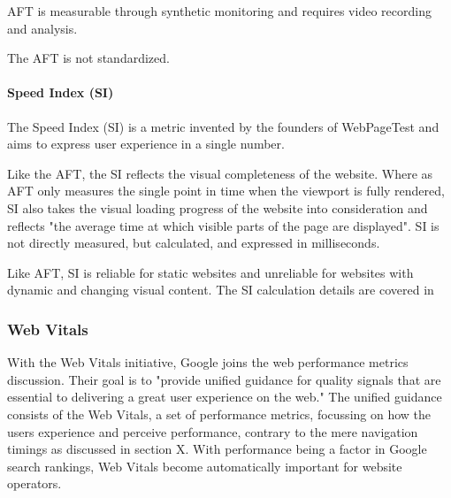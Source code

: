 AFT is measurable through synthetic monitoring and requires video recording and analysis. %

The AFT is not standardized. %





\paragraph{Speed Index (SI)}

The Speed Index (SI) is a metric invented by the founders of WebPageTest and aims to express user experience in a single number. %

Like the AFT, the SI reflects the visual completeness of the website.
Where as AFT only measures the single point in time when the viewport is fully rendered, SI also takes the visual loading progress of the website into consideration and reflects "the average time at which visible parts of the page are displayed". %
SI is not directly measured, but calculated, and expressed in milliseconds. %

Like AFT, SI is reliable for static websites and unreliable for websites with dynamic and changing visual content. %
The SI calculation details are covered in %











\subsubsection{Web Vitals}



With the Web Vitals initiative, Google joins the web performance metrics discussion.
Their goal is to "provide unified guidance for quality signals that are essential to delivering a great user experience on the web." %
The unified guidance consists of the Web Vitals, a set of performance metrics, focussing on how the users experience and perceive performance, contrary to the mere navigation timings as discussed in section X.
With performance being a factor in Google search rankings, Web Vitals become automatically important for website operators. %

